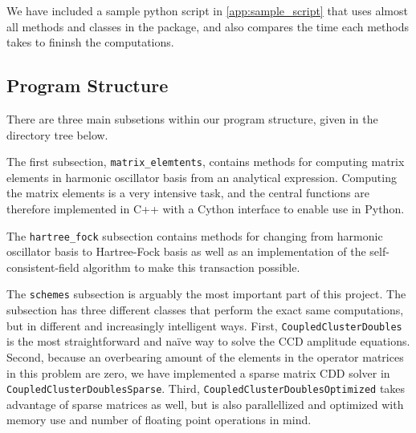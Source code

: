 \documentclass[
    a4paper, aps, twocolumn, floatfix, superscriptaddress,
    nofootinbib]{revtex4-1}
\newcommand{\1}{\mathds{1}}
\begin{document}
        We have included a sample python script in \autoref{app:sample_script}
        that uses almost all methods and classes in the package, and also compares
        the time each methods takes to fininsh the computations.

    \subsection{Program Structure}
        There are three main subsetions within our program structure,
        given in the directory tree below.

        \vspace{10pt}
        \vspace{10pt}

        The first subsection, \texttt{matrix_elemtents},
        contains methods for computing matrix elements in harmonic
        oscillator basis from an analytical
        expression\cite{anisimovas1998energy}.  Computing the matrix
        elements is a very intensive task, and the central functions are
        therefore implemented in C++ with a Cython interface to enable use
        in Python.

        The \texttt{hartree_fock} subsection contains methods
        for changing from harmonic oscillator basis to Hartree-Fock basis as
        well as an implementation of the self-consistent-field algorithm to
        make this transaction possible.

        The \texttt{schemes} subsection is arguably the most
        important part of this project. The subsection has three different
        classes that perform the exact same computations, but in different
        and increasingly intelligent ways. First,
        \texttt{CoupledClusterDoubles} is the most
        straightforward and naïve way to solve the CCD amplitude equations.
        Second, because an overbearing amount of the elements in the
        operator matrices in this problem are zero, we have implemented a
        sparse matrix CDD solver in
        \texttt{CoupledClusterDoublesSparse}. Third,
        \texttt{CoupledClusterDoublesOptimized} takes advantage
        of sparse matrices as well, but is also parallellized and optimized
        with memory use and number of floating point operations in mind.
\end{document}
